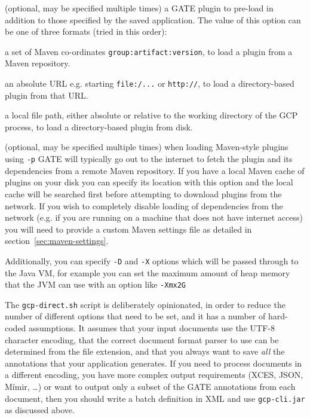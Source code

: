 \item[-p] (optional, may be specified multiple times) a GATE plugin to pre-load
  in addition to those specified by the saved application.  The value of this
  option can be one of three formats (tried in this order):
  \ben
  \item a set of Maven co-ordinates \verb!group:artifact:version!, to load
    a plugin from a Maven repository.
  \item an absolute URL e.g. starting \verb!file:/...! or \verb!http://!, to
    load a directory-based plugin from that URL.
  \item a local file path, either absolute or relative to the working directory
    of the GCP process, to load a directory-based plugin from disk.
  \een
\item[-C] (optional, may be specified multiple times) when loading Maven-style
  plugins using \verb!-p! GATE will typically go out to the internet to fetch the
  plugin and its dependencies from a remote Maven repository.  If you have a local
  Maven cache of plugins on your disk you can specify its location with this option
  and the local cache will be searched first before attempting to download plugins
  from the network.  If you wish to completely disable loading of dependencies from
  the network (e.g. if you are running on a machine that does not have internet
  access) you will need to provide a custom Maven settings file as detailed in
  section~\ref{sec:maven-settings}.
\ede

Additionally, you can specify \verb!-D! and \verb!-X! options which will be
passed through to the Java VM, for example you can set the maximum amount of
heap memory that the JVM can use with an option like \verb!-Xmx2G!

The \verb!gcp-direct.sh! script is deliberately opinionated, in order to reduce
the number of different options that need to be set, and it has a number of
hard-coded assumptions.  It assumes that your input documents use the UTF-8
character encoding, that the correct document format parser to use can be
determined from the file extension, and that you always want to save \emph{all}
the annotations that your application generates.  If you need to process
documents in a different encoding, you have more complex output requirements
(XCES, JSON, M\'{i}mir, \ldots) or want to output only a subset of the GATE
annotations from each document, then you should write a batch definition in XML
and use \verb!gcp-cli.jar! as discussed above.

